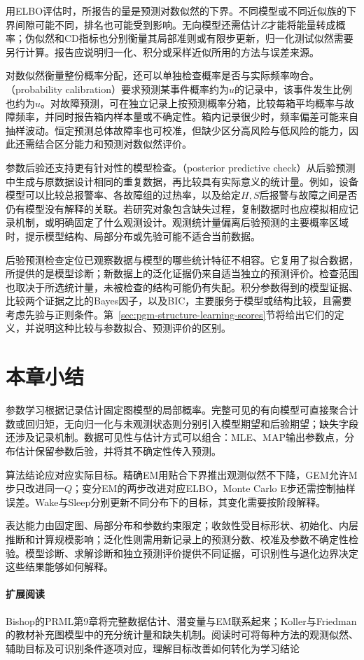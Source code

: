 用ELBO评估时，所报告的量是预测对数似然的下界。不同模型或不同近似族的下界间隙可能不同，排名也可能受到影响。无向模型还需估计$Z$才能将能量转成概率；伪似然和CD指标也分别衡量其局部准则或有限步更新，归一化测试似然需要另行计算。报告应说明归一化、积分或采样近似所用的方法与误差来源。

对数似然衡量整份概率分配，还可以单独检查概率是否与实际频率吻合。（probability calibration）要求预测某事件概率约为$u$的记录中，该事件发生比例也约为$u$。对故障预测，可在独立记录上按预测概率分箱，比较每箱平均概率与故障频率，并同时报告箱内样本量或不确定性。箱内记录很少时，频率偏差可能来自抽样波动。恒定预测总体故障率也可校准，但缺少区分高风险与低风险的能力，因此还需结合区分能力和预测对数似然评价。

参数后验还支持更有针对性的模型检查。（posterior predictive check）从后验预测中生成与原数据设计相同的重复数据，再比较具有实际意义的统计量。例如，设备模型可以比较总报警率、各故障组的过热率，以及给定$H,S$后报警与故障之间是否仍有模型没有解释的关联。若研究对象包含缺失过程，复制数据时也应模拟相应记录机制，或明确固定了什么观测设计。观测统计量偏离后验预测的主要概率区域时，提示模型结构、局部分布或先验可能不适合当前数据。

后验预测检查定位已观察数据与模型的哪些统计特征不相容。它复用了拟合数据，所提供的是模型诊断；新数据上的泛化证据仍来自适当独立的预测评价。检查范围也取决于所选统计量，未被检查的结构可能仍有失配。积分参数得到的模型证据、比较两个证据之比的Bayes因子，以及BIC，主要服务于模型或结构比较，且需要考虑先验与正则条件。第~\ref{sec:pgm-structure-learning-scores}节将给出它们的定义，并说明这种比较与参数拟合、预测评价的区别。

\section{本章小结}
\label{sec:pgm-parameter-learning-summary}

参数学习根据记录估计固定图模型的局部概率。完整可见的有向模型可直接聚合计数或回归矩，无向归一化与未观测状态则分别引入模型期望和后验期望；缺失字段还涉及记录机制。数据可见性与估计方式可以组合：MLE、MAP输出参数点，分布估计保留参数后验，并将其不确定性传入预测。

算法结论应对应实际目标。精确EM用贴合下界推出观测似然不下降，GEM允许M步只改进同一$Q$；变分EM的两步改进对应ELBO，Monte Carlo E步还需控制抽样误差。Wake与Sleep分别更新不同分布下的目标，其变化需要按阶段解释。

表达能力由固定图、局部分布和参数约束限定；收敛性受目标形状、初始化、内层推断和计算规模影响；泛化性则需用新记录上的预测分数、校准及参数不确定性检验。模型诊断、求解诊断和独立预测评价提供不同证据，可识别性与退化边界决定这些结果能够如何解释。

\paragraph{扩展阅读}
Bishop的PRML第9章将完整数据估计、潜变量与EM联系起来；Koller与Friedman的教材补充图模型中的充分统计量和缺失机制。阅读时可将每种方法的观测似然、辅助目标及可识别条件逐项对应，理解目标改善如何转化为学习结论
